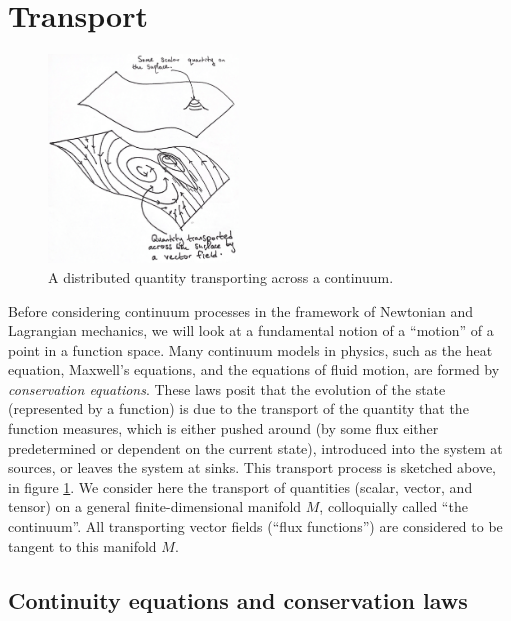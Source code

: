 \section{Transport}
\begin{figure}[H]
\centerline{\includegraphics[width=0.45\textwidth]{figures/sketches/transport.png}}
\caption{A distributed quantity transporting across a continuum.}
\label{sketch_transport}
\end{figure}
Before considering continuum processes in the framework of Newtonian and Lagrangian mechanics, we will look at a fundamental notion of a ``motion''
of a point in a function space. Many continuum models in physics, such as the heat equation,
Maxwell's equations, and the equations of fluid motion, are formed by \textit{conservation equations}. These laws posit that the
evolution of the state (represented by a function) is
due to the transport of the quantity that the function measures, which is either pushed around (by some flux either predetermined or dependent on the current state),
introduced into the system at sources, or leaves the system at sinks.
This transport process is sketched above, in figure \ref{sketch_transport}.
We consider here the transport of quantities (scalar, vector, and tensor) on a general finite-dimensional manifold $M$,
colloquially called ``the continuum''. All transporting vector fields (``flux functions'') are considered to be tangent to this manifold $M$.
\subsection{Continuity equations and conservation laws}\label{conservation_laws}
